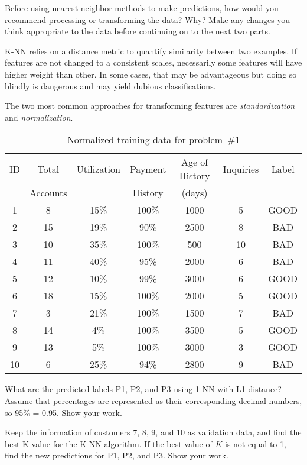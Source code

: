 \begin{subproblem}
  Before using nearest neighbor methods to make predictions, how would you recommend processing or transforming the data? Why? Make any changes you think appropriate to the data before continuing on to the next two parts.
\end{subproblem}

K-NN relies on a distance metric to quantify similarity between two examples.  If features are not changed to a consistent scales, necessarily some features will have higher weight than other.  In some cases, that may be advantageous but doing so blindly is dangerous and may yield dubious classifications.

The two most common approaches for transforming features are \textit{standardization} and \textit{normalization}.

\begin{table}[h]
  \centering
  \caption{Normalized training data for problem~\#1}\label{tab:P01:RawTraining}
  \begin{tabular}{|c||c|c|c|c|c|c|}
    \hline
    ID & Total    & Utilization & Payment & Age of History & Inquiries & Label \\
       & Accounts &             & History & (days)         &           & \\\hline\hline
    1  & 8   & 15\% & 100\% & 1000 & 5 & GOOD \\\hline
    2  & 15  & 19\% & 90\% & 2500 & 8 & BAD \\\hline
    3  & 10  & 35\% & 100\% & 500 & 10 & BAD \\\hline
    4  & 11  & 40\% & 95\% & 2000 & 6 & BAD \\\hline
    5  & 12  & 10\% & 99\% & 3000 & 6 & GOOD \\\hline
    6  & 18  & 15\% & 100\% & 2000 & 5 & GOOD \\\hline
    7  & 3   & 21\% & 100\% & 1500 & 7 & BAD \\\hline
    8  & 14  & 4\% & 100\% & 3500 & 5 & GOOD \\\hline
    9  & 13  & 5\% & 100\% & 3000 & 3 & GOOD \\\hline
    10 & 6   & 25\% & 94\% & 2800 & 9 & BAD \\\hline
  \end{tabular}
\end{table}

\begin{subproblem}
  What are the predicted labels P1, P2, and P3 using 1-NN with L1 distance? Assume that percentages are represented as their corresponding decimal numbers, so 95\% = 0.95. Show your work.
\end{subproblem}

\begin{subproblem}
  Keep the information of customers 7, 8, 9, and 10 as validation data, and find the best K value for the K-NN algorithm. If the best value of $K$ is not equal to 1, find the new predictions for P1, P2, and P3. Show your work.
\end{subproblem}


